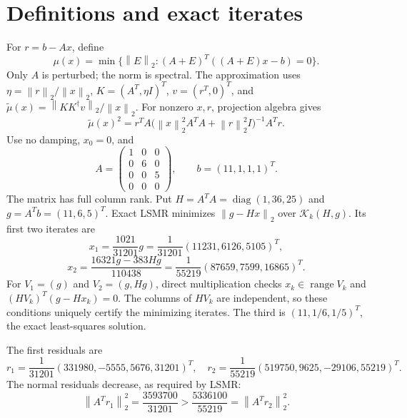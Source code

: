 \documentclass[11pt]{article}
\newcommand{\norm}[1]{\left\lVert#1\right\rVert}
\newcommand{\diag}{\operatorname{diag}}
\begin{document}
\section{Definitions and exact iterates}
For $r=b-Ax$, define
\[
\mu(x)=\min\{\norm E_2:(A+E)^T((A+E)x-b)=0\}.
\]
Only $A$ is perturbed; the norm is spectral. The approximation uses $\eta=\norm r_2/\norm x_2$, $K=(A^T,\eta I)^T$, $v=(r^T,0)^T$, and $\widetilde\mu(x)=\norm{KK^\dagger v}_2/\norm x_2$. For nonzero $x,r$, projection algebra gives
\[
\widetilde\mu(x)^2=r^TA\bigl(\norm x_2^2A^TA+\norm r_2^2I\bigr)^{-1}A^Tr.
\]
Use no damping, $x_0=0$, and
\[
A=\begin{pmatrix}1&0&0\\0&6&0\\0&0&5\\0&0&0\end{pmatrix},\qquad b=(11,1,1,1)^T.
\]
The matrix has full column rank. Put $H=A^TA=\diag(1,36,25)$ and $g=A^Tb=(11,6,5)^T$. Exact LSMR minimizes $\norm{g-Hx}_2$ over $\mathcal K_k(H,g)$. Its first two iterates are
\[
x_1=\frac{1021}{31201}g=\frac1{31201}(11231,6126,5105)^T,
\]
\[
x_2=\frac{16321g-383Hg}{110438}=\frac1{55219}(87659,7599,16865)^T.
\]
For $V_1=(g)$ and $V_2=(g,Hg)$, direct multiplication checks $x_k\in\operatorname{range}V_k$ and $(HV_k)^T(g-Hx_k)=0$. The columns of $HV_k$ are independent, so these conditions uniquely certify the minimizing iterates. The third is $(11,1/6,1/5)^T$, the exact least-squares solution.

The first residuals are
\[
r_1=\frac1{31201}(331980,-5555,5676,31201)^T,\quad
r_2=\frac1{55219}(519750,9625,-29106,55219)^T.
\]
The normal residuals decrease, as required by LSMR:
\[
\norm{A^Tr_1}_2^2=\frac{3593700}{31201}>\frac{5336100}{55219}=\norm{A^Tr_2}_2^2.
\]
\end{document}
